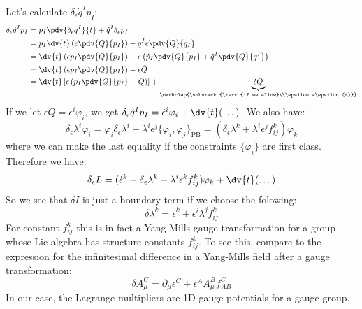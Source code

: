 \documentclass{jknotes}
\begin{document}
Let's calculate \(\delta_\epsilon \dot{q}^Ip_I\):
\begin{align}
    \delta_\epsilon \dot{q}^Ip_I
    &= p_I \pdv{\delta_\epsilon q^I}{t} + \dot{q}^I \delta_\epsilon p_I \\
    &= p_I \dv{t}\left(\epsilon\pdv{Q}{p_I}\right) - \dot{q}^I \epsilon \pdv{Q}{q_I} \\
    &= \dv{t}\left( \epsilon p_I\pdv{Q}{p_I} \right) - \epsilon \left( \dot{p}_I\pdv{Q}{p_I} + \dot{q}^I\pdv{Q}{q^I} \right) \\
    &= \dv{t}\left( \epsilon p_I\pdv{Q}{p_I} \right) - \epsilon \dot{Q} \\
    &= \dv{t}\left[ \epsilon \left( p_I \pdv{Q}{p_I} - Q \right) \right] + \underbrace{\dot{\epsilon}Q}_{\mathclap{\substack{\text{if we allow}\\\epsilon=\epsilon(t)}}}
\end{align}
If we let \(\epsilon Q = \epsilon^i\varphi_i\), we get \(\delta_\epsilon\dot{q}^Ip_I = \dot{\epsilon}^i\varphi_i + \dv{t}(\dots)\). We also have:
\begin{equation}
    \delta_\epsilon\lambda^i\varphi_i = \varphi_i\delta_\epsilon\lambda^i + \lambda^i\epsilon^j\{\varphi_i,\varphi_j\}_{\text{PB}}
    = \left( \delta_\epsilon \lambda^k + \lambda^i\epsilon^jf_{ij}^k \right)\varphi_k
\end{equation}
where we can make the last equality if the constraints \(\{\varphi_i\}\) are first class. Therefore we have:
\begin{equation}
    \delta_\epsilon L = (\dot{\epsilon}^k - \delta_\epsilon\lambda^k - \lambda^i\epsilon^kf_{ij}^k)\varphi_k + \dv{t}(\dots)
\end{equation}
So we see that \(\delta I\) is just a boundary term if we choose the folowing:
\begin{equation}
    \delta\lambda^k = \dot{\epsilon}^k + \epsilon^i\lambda^j f_{ij}^k
    \tag{\(*\)}
    \label{yangmillsupinhere}
\end{equation}
For constant \(f_{ij}^k\) this is in fact a Yang-Mills gauge transformation for a group whose Lie algebra has structure constants \(f_{ij}^k\). To see this, compare to the expression for the infinitesimal difference in a Yang-Mills field after a gauge transformation:
\begin{equation}
    \delta A_\mu^C = \partial_\mu\epsilon^C + \epsilon^AA^B_\mu f_{AB}^C
\end{equation}
In our case, the Lagrange multipliers are 1D gauge potentials for a gauge group.
\end{document}
